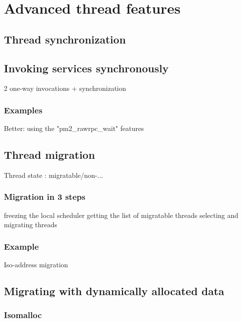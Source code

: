 \documentclass[a4paper,11pt]{article}
\begin{document}
\section{Advanced thread features}

\subsection{Thread synchronization}

\subsection{Invoking services synchronously}
        2 one-way invocations + synchronization

\subsubsection{Examples}
        Better: using the "pm2\_rawrpc\_wait" features

\subsection{Thread migration}
        Thread state : migratable/non-...

\subsubsection{Migration in 3 steps}
        freezing the local scheduler
        getting the list of migratable threads
        selecting and migrating threads

\subsubsection{Example}
        Iso-address migration

\subsection{Migrating with dynamically allocated data}

\subsubsection{Isomalloc}


\end{document}
